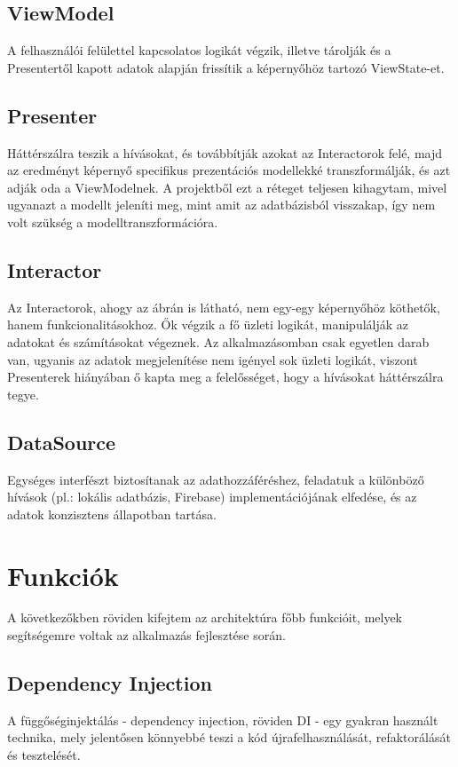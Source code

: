 \subsection{ViewModel}
A felhasználói felülettel kapcsolatos logikát végzik, illetve tárolják és a Presentertől kapott adatok alapján frissítik a képernyőhöz tartozó ViewState-et.

\subsection{Presenter}
Háttérszálra teszik a hívásokat, és továbbítják azokat az Interactorok felé, majd az eredményt képernyő specifikus prezentációs modellekké transzformálják, és azt adják oda a ViewModelnek. A projektből ezt a réteget teljesen kihagytam, mivel ugyanazt a modellt jeleníti meg, mint amit az adatbázisból visszakap, így nem volt szükség a modelltranszformációra. 

\subsection{Interactor}
Az Interactorok, ahogy az ábrán is látható, nem egy-egy képernyőhöz köthetők, hanem funkcionalitásokhoz. Ők végzik a fő üzleti logikát, manipulálják az adatokat és számításokat végeznek. Az alkalmazásomban csak egyetlen darab van, ugyanis az adatok megjelenítése nem igényel sok üzleti logikát, viszont Presenterek hiányában ő kapta meg a felelősséget, hogy a hívásokat háttérszálra tegye. 

\subsection{DataSource}
Egységes interfészt biztosítanak az adathozzáféréshez, feladatuk a különböző hívások (pl.: lokális adatbázis, Firebase) implementációjának elfedése, és az adatok konzisztens állapotban tartása. 

\section{Funkciók}

A következőkben röviden kifejtem az architektúra főbb funkcióit, melyek segítségemre voltak az alkalmazás fejlesztése során. 

\subsection{Dependency Injection}
A függőséginjektálás - dependency injection, röviden DI - egy gyakran használt technika, mely jelentősen könnyebbé teszi a kód újrafelhasználását, refaktorálását és tesztelését.\cite{DepInjection}

